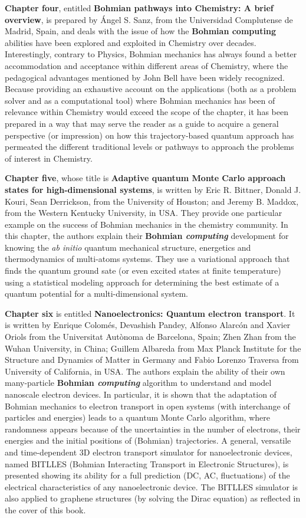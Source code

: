 \documentclass[nofootinbib, secnumarabic, amsmath, nobibnotes,11pt,aps,pra, floatfix]{revtex4-1}
\begin{document}
\textbf{Chapter four}, entitled \textbf{Bohmian pathways into Chemistry: A brief overview}, is prepared by \'Angel S. Sanz, from the Universidad Complutense de Madrid, Spain, and deals with the issue of how the \textbf{Bohmian computing} abilities have been explored and exploited in Chemistry over decades. Interestingly, contrary to Physics, Bohmian mechanics has always found a better accommodation and acceptance within different areas of Chemistry, where the pedagogical advantages mentioned by John Bell have been widely recognized.
Because providing an exhaustive account on the applications (both as a problem solver and as a computational tool) where Bohmian mechanics has been of relevance within Chemistry would exceed the scope of the chapter, it has been prepared in a way that may serve the reader as a guide to acquire a general perspective (or impression) on how this trajectory-based quantum approach has permeated the different traditional levels or pathways to approach the problems of interest in Chemistry.

\textbf{Chapter five}, whose title is \textbf{Adaptive quantum Monte Carlo approach states for high-dimensional systems}, is written by Eric R. Bittner, Donald J. Kouri, Sean Derrickson, from the University of Houston; and Jeremy B. Maddox, from the Western Kentucky University, in USA. They provide one particular example on the success of Bohmian mechanics in the chemistry community. In this chapter, the authors explain their \textbf{Bohmian \emph{computing}} development for knowing the \emph{ab initio} quantum mechanical structure, energetics and thermodynamics of multi-atoms systems. They use a variational approach that finds the quantum ground sate (or even excited states at finite temperature) using a statistical modeling approach for determining the best estimate of a quantum potential for a multi-dimensional system.

\textbf{Chapter six} is entitled \textbf{Nanoelectronics: Quantum electron transport}. It is written by Enrique Colom\'es, Devashish Pandey,  Alfonso Alarc\'on  and Xavier Oriols from the Universitat Aut\`{o}noma de Barcelona, Spain; Zhen Zhan from the Wuhan University, in China; Guillem Albareda from Max Planck Institute for the Structure and Dynamics of Matter in Germany and  Fabio Lorenzo Traversa from University of California, in USA. The authors explain the ability of their own many-particle \textbf{Bohmian \emph{computing}} algorithm to understand and model nanoscale electron devices. In particular, it is shown that the adaptation of Bohmian mechanics to electron transport in open systems (with interchange of particles and energies) leads to a quantum Monte Carlo algorithm, where randomness appears because of the uncertainties in the number of electrons, their energies and the initial positions of (Bohmian) trajectories. A general, versatile and time-dependent 3D electron transport simulator for nanoelectronic devices, named BITLLES (Bohmian Interacting Transport in Electronic Structures), is presented showing its ability for a full prediction (DC, AC, fluctuations) of the electrical characteristics of any nanoelectronic device. The BITLLES simulator is also applied to graphene structures (by solving the Dirac equation) as reflected in the cover of this book.
\end{document}
